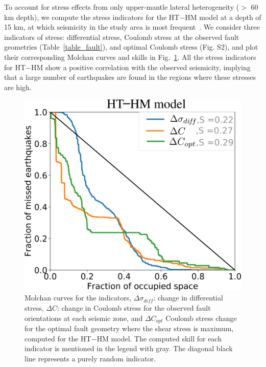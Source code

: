\documentclass[draft,linenumbers]{agujournal2018}
\begin{document}
To account for stress effects from only upper-mantle lateral heterogeneity ($>$ 60 km depth), we compute the stress indicators for the HT$-$HM model at a depth of 15 km, at which seismicity in the study area is most frequent~\citep[e.g.,][]{mazzotti2010state}. We consider three indicators of stress: differential stress, Coulomb stress at the observed fault geometries (Table~\ref{table_fault}), and optimal Coulomb stress (Fig. S2), and plot their corresponding Molchan curves and skills in Fig.~\ref{ht_hm_skill}. All the stress indicators for HT$-$HM show a positive correlation with the observed seismicity, implying that a large number of earthquakes are found in the regions where these stresses are high. 
%
\begin{figure}
\centering
	\includegraphics[width=0.5\linewidth]{figures/ht_hm_updated.png}
	\caption{Molchan curves for the indicators, $\Delta \sigma_{diff}$: change in differential stress, $\Delta C$: change in Coulomb stress for the observed fault orientations at each seismic zone, and $\Delta C_{opt}$ Coulomb stress change for the optimal fault geometry where the shear stress is maximum, computed for the HT$-$HM  model. The computed skill for each indicator is mentioned in the legend with gray. The diagonal black line represents a purely random indicator. }
	\label{ht_hm_skill}
\end{figure}
\end{document}

